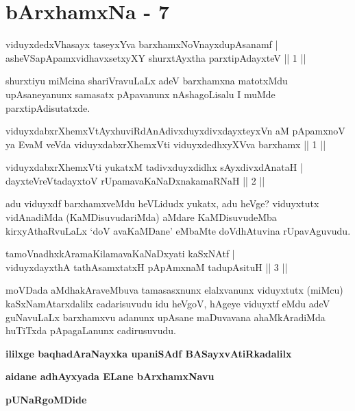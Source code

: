 \chapter{bArxhamxNa - 7}

\begin{shl}
viduyxdedxVhasayx taseyxYva barxhamxNoV\s nayxdupAsanamf | \\
asheVSapApamxvidhavxsetxyXY shurxtAyx\s tha parxtipAdayxteV \hfill ||  1 || 
\end{shl}

\begin{artha}
shurxtiyu miMcina shariVravuLaLx adeV barxhamxna matotxMdu upAsaneyanunx samasatx pApavanunx nAshagoLisalu I muMde parxtipAdisutatxde.
\end{artha}

\begin{kandikeshl}
viduyxdabxrXhemxVtAyxhuviRdAnAdivxduyxdivxdayxteyxVn aM pApamxnoV ya EvaM veVda viduyxdabxrXhemxVti viduyxdedhxyXVva barxhamx || 1 ||
\end{kandikeshl}


\begin{shl}
viduyxdabxrXhemxVti yukatxM tadivxduyxdidhx sAyxdivxdAnataH | \\
dayxteVreVtadayxtoV rUpamavaKaNaDxnakamaRNaH \hfill ||  2 || 
\end{shl}

\begin{artha}
adu viduyxdf barxhamxveMdu heVLidudx yukatx, adu heVge? viduyxtutx vidAnadiMda (KaMDisuvudariMda) aMdare KaMDisuvudeMba kirxyAthaRvuLaLx `doV avaKaMDane' eMbaMte doVdhAtuvina rUpavAguvudu.
\end{artha}

\begin{shl}
tamoV\s nadhxkAramaKilamavaKaNaDxyati kaSxNAtf  | \\
viduyxdayxthA tathA\s samxtatxH pApAmxnaM tadupAsituH \hfill ||  3 ||
\end{shl}

\begin{artha}
moVDada aMdhakAraveMbuva tamasasxnunx elalxvanunx viduyxtutx (miMcu) kaSxNamAtarxdalilx cadarisuvudu idu heVgoV, hAgeye viduyxtf eMdu adeV guNavuLaLx barxhamxvu adanunx upAsane maDuvavana ahaMkAradiMda huTiTxda pApagaLanunx cadirusuvudu.
\end{artha}

\begin{center}
{\bf ililxge baqhadAraNayxka upaniSAdf BASayxvAtiRkadalilx}
\smallskip

{\bf aidane adhAyxyada ELane bArxhamxNavu}
\smallskip

{\bf pUNaRgoMDide}
\end{center}
